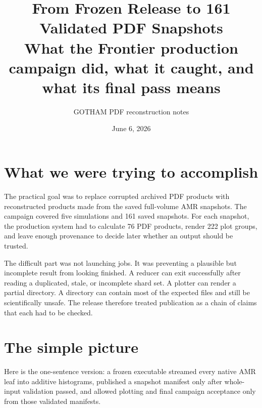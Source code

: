 \documentclass[11pt]{article}
\title{From Frozen Release to 161 Validated PDF Snapshots\\
\large What the Frontier production campaign did, what it caught, and what its final pass means}
\author{GOTHAM PDF reconstruction notes}
\date{June 6, 2026}
\begin{document}
\maketitle


\section{What we were trying to accomplish}

The practical goal was to replace corrupted archived PDF products with
reconstructed products made from the saved full-volume AMR snapshots. The
campaign covered five simulations and 161 saved snapshots. For each snapshot,
the production system had to calculate 76 PDF products, render 222 plot
groups, and leave enough provenance to decide later whether an output should
be trusted.

The difficult part was not launching jobs. It was preventing a plausible but
incomplete result from looking finished. A reducer can exit successfully after
reading a duplicated, stale, or incomplete shard set. A plotter can render a
partial directory. A directory can contain most of the expected files and
still be scientifically unsafe. The release therefore treated publication as
a chain of claims that each had to be checked.

\section{The simple picture}

Here is the one-sentence version: a frozen executable streamed every native
AMR leaf into additive histograms, published a snapshot manifest only after
whole-input validation passed, and allowed plotting and final campaign
acceptance only from those validated manifests.
\end{document}
